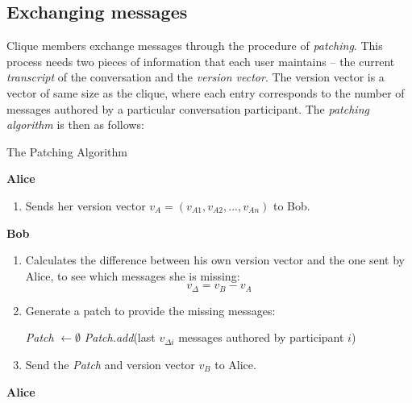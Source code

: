 \documentclass[a4paper, twoside, 12pt]{report}
\begin{document}
\subsection{Exchanging messages}
\label{subsec:prep.patching}
Clique members exchange messages through the procedure of \emph{patching}. This process needs two pieces of information that each user maintains -- the current \emph{transcript} of the conversation and the \emph{version vector}. The version vector is a vector of same size as the clique, where each entry corresponds to the number of messages authored by a particular conversation participant. The \emph{patching algorithm} is then as follows:
\begin{algorithm}
\caption{The Patching Algorithm}
\label{alg:patching}
\vspace{2pt}
{\bfseries Alice}
\begin{enumerate}[topsep=2pt, itemsep=2pt]
    \item Sends her version vector $v_A = (v_{A1}, v_{A2}, ..., v_{An})$ to Bob. \\
\end{enumerate}
\vspace{-2pt}
{\bfseries Bob}
\begin{enumerate}[topsep=2pt, itemsep=2pt]
    \item Calculates the difference between his own version vector and the one sent by Alice, to see which messages she is missing:
        \begin{equation*}
            v_{\Delta} = v_B - v_A
        \end{equation*}
    \item {Generate a patch to provide the missing messages: \newline \vspace{-5mm}}
        \begin{algorithmic}
            \STATE \textit{Patch} $\leftarrow \emptyset$
                    \STATE \textit{Patch.add}(last $v_{\Delta i}$ messages authored by participant $i$)                        
                \ENDIF
            \ENDFOR
        \end{algorithmic}
    \item Send the \textit{Patch} and version vector $v_B$ to Alice. \\
\end{enumerate}
\vspace{-2pt}
{\bfseries Alice}
\begin{enumerate}[topsep=2pt, itemsep=2pt]

\end{enumerate}
\end{algorithm}
\end{document}
